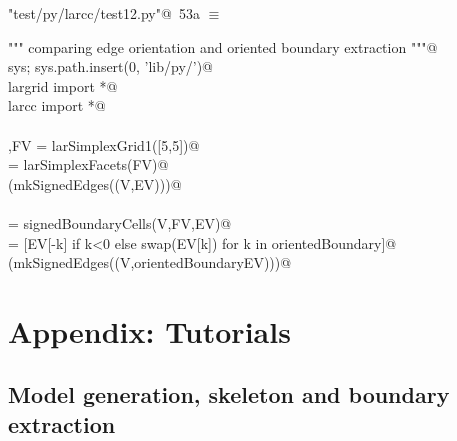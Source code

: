 \documentclass[11pt,oneside]{article}    %
\begin{document}
\begin{flushleft} \small \label{scrap85}
\protect{}\verb@"test/py/larcc/test12.py"@\nobreak\ {\footnotesize 53a }$\equiv$
\vspace{-1ex}
\begin{list}{}{} \item
\mbox{}\verb@""" comparing edge orientation and oriented boundary extraction """@\\
\mbox{}\verb@import sys; sys.path.insert(0, 'lib/py/')@\\
\mbox{}\verb@from largrid import *@\\
\mbox{}\verb@from larcc import *@\\
\mbox{}\verb@@\\
\mbox{}\verb@V,FV = larSimplexGrid1([5,5])@\\
\mbox{}\verb@EV = larSimplexFacets(FV)@\\
\mbox{}\verb@VIEW(mkSignedEdges((V,EV)))@\\
\mbox{}\verb@@\\
\mbox{}\verb@orientedBoundary = signedBoundaryCells(V,FV,EV)@\\
\mbox{}\verb@orientedBoundaryEV = [EV[-k] if k<0 else swap(EV[k]) for k in orientedBoundary]@\\
\mbox{}\verb@VIEW(mkSignedEdges((V,orientedBoundaryEV)))@\\
\mbox{}\verb@@{\NWsep}
\end{list}
\vspace{-2ex}
\end{flushleft}



\appendix

\section{Appendix: Tutorials}


\subsection{Model generation, skeleton and boundary extraction}
\end{document}
